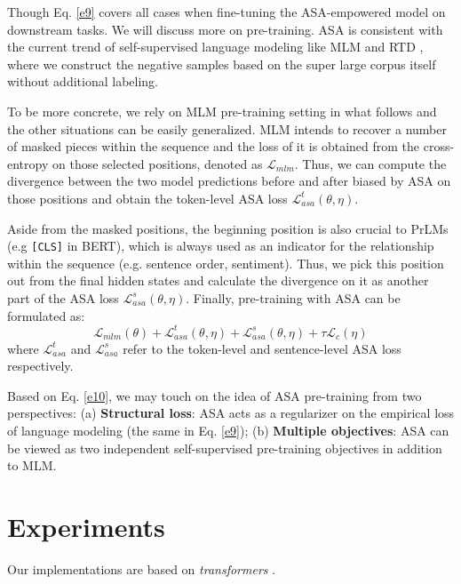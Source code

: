 \documentclass[letterpaper]{article} \usepackage{aaai23}  \usepackage{times}  \usepackage{helvet}  \usepackage{courier}  \usepackage[hyphens]{url}  \usepackage{graphicx} \urlstyle{rm} \def\UrlFont{\rm}  \usepackage{natbib}  \usepackage{caption} \frenchspacing  \setlength{\pdfpagewidth}{8.5in}  \setlength{\pdfpageheight}{11in}  \usepackage{algorithm}
\begin{document}
Though Eq. \ref{e9} covers all cases when fine-tuning the ASA-empowered model on downstream tasks. We will discuss more on pre-training. ASA is consistent with the current trend of self-supervised language modeling like MLM \citep{DBLP:conf/naacl/DevlinCLT19} and RTD \citep{DBLP:conf/iclr/ClarkLLM20}, where we construct the negative samples based on the super large corpus itself without additional labeling.

To be more concrete, we rely on MLM pre-training setting \citep{DBLP:conf/naacl/DevlinCLT19} in what follows and the other situations can be easily generalized. MLM intends to recover a number of masked pieces within the sequence and the loss of it is obtained from the cross-entropy on those selected positions, denoted as $ \mathcal L_{mlm} $. Thus, we can compute the divergence between the two model predictions before and after biased by ASA on those positions and obtain the token-level ASA loss $ \mathcal L^t_{asa}(\theta,\eta) $.

Aside from the masked positions, the beginning position is also crucial to PrLMs (e.g \texttt{[CLS]} in BERT), which is always used as an indicator for the relationship within the sequence (e.g. sentence order, sentiment). Thus, we pick this position out from the final hidden states and calculate the divergence on it as another part of the ASA loss $ \mathcal L^s_{asa}(\theta,\eta) $. Finally, pre-training with ASA can be formulated as:
\begin{equation}
\mathcal L_{mlm}(\theta) + \mathcal L^t_{asa}(\theta,\eta) + \mathcal L^s_{asa}(\theta,\eta) + \tau \mathcal L_c(\eta)
\label{e10}
\end{equation}
where $ \mathcal L^t_{asa} $ and $ \mathcal L^s_{asa} $ refer to the token-level and sentence-level ASA loss respectively.

Based on Eq. \ref{e10}, we may touch on the idea of ASA pre-training from two perspectives: (a) \textbf{Structural loss}: ASA acts as a regularizer on the empirical loss of language modeling (the same in Eq. \ref{e9}); (b) \textbf{Multiple objectives}: ASA can be viewed as two independent self-supervised pre-training objectives in addition to MLM.


\section{Experiments}
\label{s4}

Our implementations are based on \emph{transformers} \citep{wolf-etal-2020-transformers}.
\end{document}
